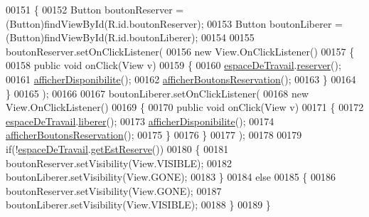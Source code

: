 \begin{DoxyCode}
00151     \{
00152         Button boutonReserver = (Button)findViewById(R.id.boutonReserver);
00153         Button boutonLiberer = (Button)findViewById(R.id.boutonLiberer);
00154 
00155         boutonReserver.setOnClickListener(
00156                 \textcolor{keyword}{new} View.OnClickListener()
00157                 \{
00158                     \textcolor{keyword}{public} \textcolor{keywordtype}{void} onClick(View v)
00159                     \{
00160                         \hyperlink{classcom_1_1lasalle_1_1meeting_1_1_affichage_espace_de_travail_a934d41c1c41882b94b65a95cee5aca13}{espaceDeTravail}.\hyperlink{classcom_1_1lasalle_1_1meeting_1_1_espace_de_travail_a42d483a68e6d0d50707dbd3dddd164c2}{reserver}();
00161                         \hyperlink{classcom_1_1lasalle_1_1meeting_1_1_affichage_espace_de_travail_a597703fc6f7e82b79ac7047640fa9323}{afficherDisponibilite}();
00162                         \hyperlink{classcom_1_1lasalle_1_1meeting_1_1_affichage_espace_de_travail_a01e3d2585c84043dbe5086a2fc81c371}{afficherBoutonsReservation}();
00163                     \}
00164                 \}
00165         );
00166 
00167         boutonLiberer.setOnClickListener(
00168                 \textcolor{keyword}{new} View.OnClickListener()
00169                 \{
00170                     \textcolor{keyword}{public} \textcolor{keywordtype}{void} onClick(View v)
00171                     \{
00172                         \hyperlink{classcom_1_1lasalle_1_1meeting_1_1_affichage_espace_de_travail_a934d41c1c41882b94b65a95cee5aca13}{espaceDeTravail}.\hyperlink{classcom_1_1lasalle_1_1meeting_1_1_espace_de_travail_affce017a0a5ba338d7b0b7f6bbce6c68}{liberer}();
00173                         \hyperlink{classcom_1_1lasalle_1_1meeting_1_1_affichage_espace_de_travail_a597703fc6f7e82b79ac7047640fa9323}{afficherDisponibilite}();
00174                         \hyperlink{classcom_1_1lasalle_1_1meeting_1_1_affichage_espace_de_travail_a01e3d2585c84043dbe5086a2fc81c371}{afficherBoutonsReservation}();
00175                     \}
00176                 \}
00177         );
00178 
00179         \textcolor{keywordflow}{if}(!\hyperlink{classcom_1_1lasalle_1_1meeting_1_1_affichage_espace_de_travail_a934d41c1c41882b94b65a95cee5aca13}{espaceDeTravail}.\hyperlink{classcom_1_1lasalle_1_1meeting_1_1_espace_de_travail_a69fe30f8d3aff92986f4c39402e16ab0}{getEstReserve}())
00180         \{
00181             boutonReserver.setVisibility(View.VISIBLE);
00182             boutonLiberer.setVisibility(View.GONE);
00183         \}
00184         \textcolor{keywordflow}{else}
00185         \{
00186             boutonReserver.setVisibility(View.GONE);
00187             boutonLiberer.setVisibility(View.VISIBLE);
00188         \}
00189     \}
\end{DoxyCode}
